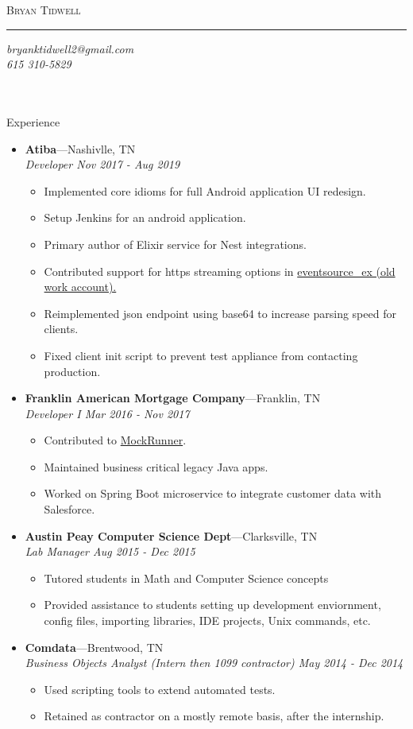 \documentclass[11pt,oneside]{article}
\makeatletter
\newcommand{\name}{Bryan Tidwell}
\newcommand{\email}{bryanktidwell2@gmail.com}
\newcommand{\bigname}[1]{
	\begin{center}\fontfamily{phv}\selectfont\Huge\scshape#1\end{center}
}
\newenvironment{ressection}[1]{
	\vspace{4pt}
	{\fontfamily{phv}\selectfont\Large#1}
	\begin{itemize}
	\vspace{3pt}
}{
	\end{itemize}
}
\newcommand{\ressubitem}[1]{
	\vspace{-1pt}
	\item \begin{flushleft} #1 \end{flushleft}
}
\newcommand{\resbigitem}[3]{
	\vspace{-5pt}
	\item
	\textbf{#1}---#2 \\
	\textit{#3}
}
\newenvironment{ressubsec}[3]{
	\resbigitem{#1}{#2}{#3}
	\vspace{-2pt}
	\begin{itemize}
}{
	\end{itemize}
}
\makeatother
\begin{document}
 \selectfont

\bigname{\name}

\vspace{-8pt} \rule{\textwidth}{1pt}

\vspace{-1pt} {\small\itshape \hfill \email} \\ 
\vspace{-1pt} {\small\itshape \hfill 615 310-5829} \\ \\
 \\ 
\vspace{5 pt}

\begin{ressection}{Experience}
        \begin{ressubsec}{Atiba}{Nashivlle, TN}{Developer Nov 2017 - Aug 2019} 
		\ressubitem{Implemented core idioms for full Android application UI redesign.}
		\ressubitem{Setup Jenkins for an android application.}
		\ressubitem{Primary author of Elixir service for Nest integrations.} 
        \ressubitem{Contributed support for https streaming options in \href{https://github.com/cwc/eventsource_ex/pull/10/files}{eventsource\_ex (old work account).}}
		\ressubitem{Reimplemented json endpoint using base64 to increase parsing speed for clients.}  
		\ressubitem{Fixed client init script to prevent test appliance from contacting production.}
	\end{ressubsec}

			\begin{ressubsec}{Franklin American Mortgage Company}{Franklin, TN}{Developer I Mar 2016 - Nov 2017}
                    \ressubitem{Contributed to \href{https://github.com/mockrunner/mockrunner/pull/42}{MockRunner}.}
		\ressubitem{Maintained business critical legacy Java apps.}
		\ressubitem{Worked on Spring Boot microservice to integrate customer data with Salesforce.}
	\end{ressubsec}


	\begin{ressubsec}{Austin Peay Computer Science Dept}{Clarksville, TN}{Lab Manager Aug 2015 - Dec 2015}
		\ressubitem{Tutored students in Math and Computer Science concepts}
		\ressubitem{Provided assistance to students setting up development enviornment, config files, importing libraries, IDE projects, Unix commands, etc.}
	\end{ressubsec}

	\begin{ressubsec}{Comdata}{Brentwood, TN}{Business Objects Analyst (Intern then 1099 contractor) May 2014 - Dec 2014}
    \ressubitem{Used scripting tools to extend automated tests.}
    \ressubitem{Retained as contractor on a mostly remote basis, after the internship.}
	\end{ressubsec}

\end{ressection}
\end{document}
